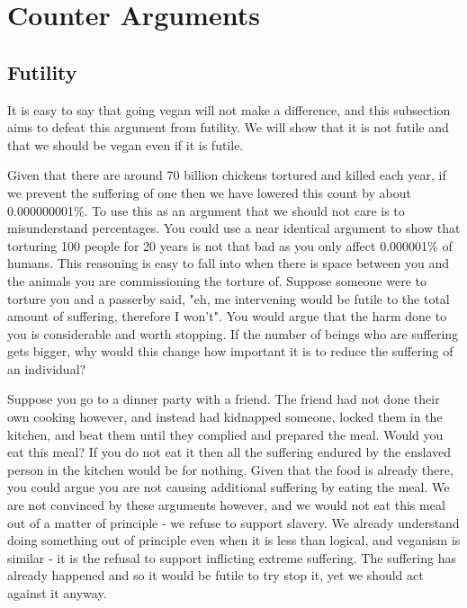 \section{Counter Arguments}
\label{sec:CounterArguments}

\subsection{Futility}

It is easy to say that going vegan will not make a difference, and this subsection aims to defeat this argument from futility. We will show that it is not futile and that we should be vegan even if it is futile.

Given that there are around 70 billion chickens tortured and killed each year, if we prevent the suffering of one then we have lowered this count by about 0.000000001\%. To use this as an argument that we should not care is to misunderstand percentages. You could use a near identical argument to show that torturing 100 people for 20 years is not that bad as you only affect 0.000001\% of humans. This reasoning is easy to fall into when there is space between you and the animals you are commissioning the torture of. Suppose someone were to torture you and a passerby said, "eh, me intervening would be futile to the total amount of suffering, therefore I won't". You would argue that the harm done to you is considerable and worth stopping. If the number of beings who are suffering gets bigger, why would this change how important it is to reduce the suffering of an individual?

Suppose you go to a dinner party with a friend. The friend had not done their own cooking however, and instead had kidnapped someone, locked them in the kitchen, and beat them until they complied and prepared the meal. Would you eat this meal? If you do not eat it then all the suffering endured by the enslaved person in the kitchen would be for nothing. Given that the food is already there, you could argue you are not causing additional suffering by eating the meal. We are not convinced by these arguments however, and we would not eat this meal out of a matter of principle - we refuse to support slavery. We already understand doing something out of principle even when it is less than logical, and veganism is similar - it is the refusal to support inflicting extreme suffering. The suffering has already happened and so it would be futile to try stop it, yet we should act against it anyway.

